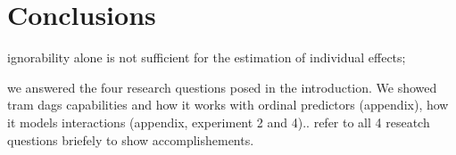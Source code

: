 

\chapter{Conclusions}



ignorability alone is not sufficient for the estimation of individual effects;





we answered the four research questions posed in the introduction. We showed tram dags capabilities and how it works with ordinal predictors (appendix), how it models interactions (appendix, experiment 2 and 4).. 
refer to all 4 reseatch questions briefely to show accomplishements.


